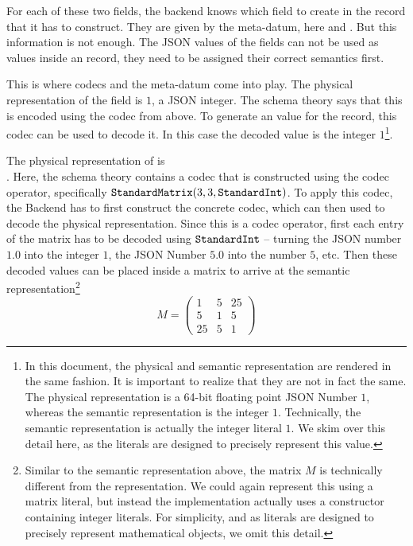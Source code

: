 For each of these two fields, the backend knows which field to create in the \mmt record
that it has to construct.  They are given by the  meta-datum, here
 and .  But this information is not
enough.  The JSON values of the fields can not be used as values inside an \mmt record,
they need to be assigned their correct semantics first.

This is where codecs and the  meta-datum come into play. 
The physical representation of the  field is $1$, a JSON integer. 
The schema theory says that this is encoded using the  codec from above. 
To generate an \mmt value for the record, this codec can be used to decode it. 
In this case the decoded value is the integer $1$\footnote{
  In this document, the physical and semantic representation are rendered in the same fashion. 
  It is important to realize that they are not in fact the same. 
  The physical representation is a 64-bit floating point JSON Number $1$, whereas the semantic representation is the integer $1$. 
  Technically, the semantic representation is actually the \ommt integer literal $1$. 
  We skim over this detail here, as the \ommt literals are designed to precisely represent this value. 
}. 

The physical representation of  is
\\\noindent\inlinecode{[[1.0,5.0,25.0],[5.0,1.0,5.0],[25.0,5.0,1.0]]}.  Here, the schema theory
contains a codec that is constructed using the  codec operator,
specifically $\plaintt{StandardMatrix}(3, 3,
\plaintt{StandardInt})$.  To apply this codec, the Backend has to first construct the
concrete codec, which can then used to decode the physical representation.  Since this is
a codec operator, first each entry of the matrix has to be decoded using
$\plaintt{StandardInt}$ -- turning the JSON number $1.0$ into the integer
$1$, the JSON Number $5.0$ into the number
$5$, etc.  Then these decoded values can be placed inside a matrix to arrive at the
semantic representation\footnote{Similar to the semantic representation above, the matrix
  $M$ is technically different from the \ommt representation.  We could again represent
  this using a matrix literal, but instead the implementation actually uses a constructor
  containing integer literals.  For simplicity, and as literals are designed to precisely
  represent mathematical objects, we omit this detail.  } 
\[M = \left( \begin{array}{ccc}
               1 & 5 & 25 \\
               5 & 1 & 5 \\
               25 & 5 & 1 
             \end{array}
           \right)
\]

